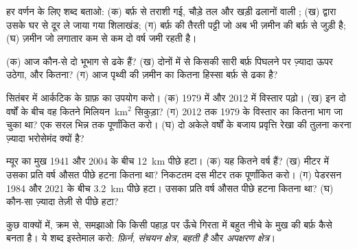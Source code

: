 \begin{exercise}[$\star$]\label{exo:g8:ice-on-earth:3}
हर वर्णन के लिए शब्द बताओ: (क) बर्फ़ से तराशी गई, चौड़े तल और खड़ी ढलानों वाली ;
(ख)  द्वारा उसके घर से दूर ले जाया गया शिलाखंड; (ग) बर्फ़ की तैरती पट्टी जो अब भी
ज़मीन की बर्फ़ से जुड़ी है; (घ) ज़मीन जो लगातार कम से कम दो वर्ष जमी रहती
है।
\end{exercise}

\begin{exercise}[$\star$]\label{exo:g8:ice-on-earth:4}
(क) आज कौन-से दो भूभाग  से ढके हैं? (ख) दोनों में से किसकी सारी बर्फ़ पिघलने
पर  ज़्यादा ऊपर उठेगा, और कितना? (ग) आज पृथ्वी की ज़मीन का कितना हिस्सा बर्फ़ से
ढका है?
\end{exercise}

\begin{exercise}[$\star\star$]\label{exo:g8:ice-on-earth:5}
सितंबर में आर्कटिक  के ग्राफ़ का उपयोग करो। (क) 1979 में और 2012 में
विस्तार पढ़ो। (ख) इन दो वर्षों के बीच वह कितने मिलियन~km$^2$ सिकुड़ा? (ग) 2012 तक
1979 के विस्तार का कितना भाग जा चुका था? एक सरल भिन्न तक पूर्णांकित करो। (घ) दो
अकेले वर्षों के बजाय प्रवृत्ति रेखा की तुलना करना ज़्यादा भरोसेमंद क्यों
है?
\end{exercise}

\begin{exercise}[$\star\star$]\label{exo:g8:ice-on-earth:6}
म्यूर  का मुख 1941 और 2004 के बीच \qty{12}{km} पीछे हटा। (क) यह कितने वर्ष
हैं? (ख) मीटर में उसका प्रति वर्ष औसत पीछे हटना कितना था? निकटतम दस मीटर तक
पूर्णांकित करो। (ग) पेडरसन  1984 और 2021 के बीच \qty{3.2}{km} पीछे हटा।
उसका प्रति वर्ष औसत पीछे हटना कितना था? (घ) कौन-सा  ज़्यादा तेज़ी से पीछे
हटा?
\end{exercise}

\begin{exercise}[$\star\star$]\label{exo:g8:ice-on-earth:7}
कुछ वाक्यों में, क्रम से, समझाओ कि किसी पहाड़ पर ऊँचे गिरता   में बहुत नीचे
 के मुख की बर्फ़ कैसे बनता है। ये शब्द इस्तेमाल करो: \emph{फ़िर्न},
\emph{संचयन क्षेत्र}, \emph{बहती है} और
\emph{अपक्षरण क्षेत्र}।
\end{exercise}

